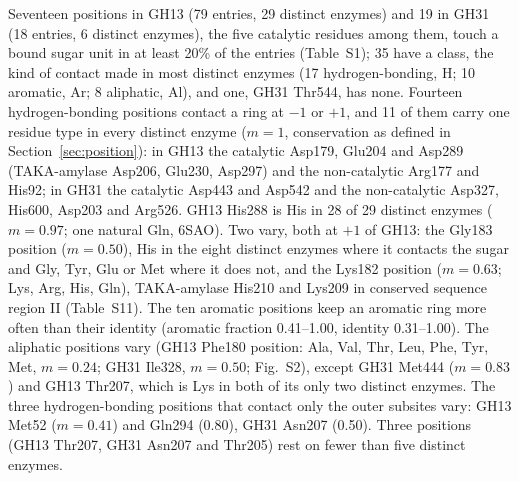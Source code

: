 \documentclass[preprint,12pt]{elsarticle}
\begin{document}
Seventeen positions in GH13 (79 entries, 29 distinct enzymes) and 19 in GH31 (18 entries, 6 distinct enzymes), the five catalytic residues among them, touch a bound sugar unit in at least 20\% of the entries
(Table~S1); 35 have a class, the kind of contact made in most distinct enzymes (17 hydrogen-bonding, H; 10 aromatic, Ar; 8 aliphatic, Al), and one, GH31 Thr544, has none. Fourteen
hydrogen-bonding positions contact a ring at $-1$ or $+1$, and 11 of them carry one residue type in every distinct enzyme ($m
= 1$, conservation as defined in Section~\ref{sec:position}): in GH13 the catalytic Asp179, Glu204 and Asp289 (TAKA-amylase Asp206, Glu230, Asp297) and the non-catalytic
Arg177 and His92; in GH31 the catalytic Asp443 and Asp542 and the non-catalytic Asp327, His600, Asp203 and Arg526.
GH13 His288 is His in 28 of 29 distinct enzymes ($m = 0.97$; one natural Gln, 6SAO). Two vary, both at $+1$ of GH13: the
Gly183 position ($m = 0.50$), His in the eight distinct enzymes where it contacts the sugar and Gly, Tyr, Glu or Met where it
does not, and the Lys182 position ($m = 0.63$; Lys, Arg, His, Gln), TAKA-amylase His210 and Lys209 in conserved
sequence region II (Table~S11). The ten aromatic positions keep an aromatic ring more often than their identity
(aromatic fraction 0.41--1.00, identity 0.31--1.00). The aliphatic positions vary (GH13 Phe180 position: Ala, Val,
Thr, Leu, Phe, Tyr, Met, $m = 0.24$; GH31 Ile328, $m = 0.50$; Fig.~S2), except GH31 Met444 ($m =
0.83$) and GH13 Thr207, which is Lys in both of its only two distinct enzymes. The three hydrogen-bonding positions that
contact only the outer subsites vary: GH13 Met52 ($m = 0.41$) and Gln294 (0.80), GH31 Asn207 (0.50). Three positions
(GH13 Thr207, GH31 Asn207 and Thr205) rest on fewer than five distinct enzymes.
\end{document}
